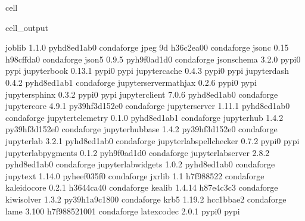 \documentclass[letterpaper,table,10pt,english]{jupyterBook}
\begin{document}
\begin{sphinxuseclass}{cell}
\begin{sphinxVerbatimOutput}
\begin{sphinxuseclass}{cell_output}
\begin{sphinxVerbatim}[commandchars=\\\{\}]
joblib                    1.1.0              pyhd8ed1ab\PYGZus{}0    conda\PYGZhy{}forge
jpeg                      9d                   h36c2ea0\PYGZus{}0    conda\PYGZhy{}forge
json\PYGZhy{}c                    0.15                 h98cffda\PYGZus{}0    conda\PYGZhy{}forge
json5                     0.9.5              pyh9f0ad1d\PYGZus{}0    conda\PYGZhy{}forge
jsonschema                3.2.0                    pypi\PYGZus{}0    pypi
jupyter\PYGZhy{}book              0.13.1                   pypi\PYGZus{}0    pypi
jupyter\PYGZhy{}cache             0.4.3                    pypi\PYGZus{}0    pypi
jupyter\PYGZhy{}dash              0.4.2              pyhd8ed1ab\PYGZus{}1    conda\PYGZhy{}forge
jupyter\PYGZhy{}server\PYGZhy{}mathjax    0.2.6                    pypi\PYGZus{}0    pypi
jupyter\PYGZhy{}sphinx            0.3.2                    pypi\PYGZus{}0    pypi
jupyter\PYGZus{}client            7.0.6              pyhd8ed1ab\PYGZus{}0    conda\PYGZhy{}forge
jupyter\PYGZus{}core              4.9.1            py39hf3d152e\PYGZus{}0    conda\PYGZhy{}forge
jupyter\PYGZus{}server            1.11.1             pyhd8ed1ab\PYGZus{}0    conda\PYGZhy{}forge
jupyter\PYGZus{}telemetry         0.1.0              pyhd8ed1ab\PYGZus{}1    conda\PYGZhy{}forge
jupyterhub                1.4.2            py39hf3d152e\PYGZus{}0    conda\PYGZhy{}forge
jupyterhub\PYGZhy{}base           1.4.2            py39hf3d152e\PYGZus{}0    conda\PYGZhy{}forge
jupyterlab                3.2.1              pyhd8ed1ab\PYGZus{}0    conda\PYGZhy{}forge
jupyterlab\PYGZhy{}spellchecker   0.7.2                    pypi\PYGZus{}0    pypi
jupyterlab\PYGZus{}pygments       0.1.2              pyh9f0ad1d\PYGZus{}0    conda\PYGZhy{}forge
jupyterlab\PYGZus{}server         2.8.2              pyhd8ed1ab\PYGZus{}0    conda\PYGZhy{}forge
jupyterlab\PYGZus{}widgets        1.0.2              pyhd8ed1ab\PYGZus{}0    conda\PYGZhy{}forge
jupytext                  1.14.0             pyheef035f\PYGZus{}0    conda\PYGZhy{}forge
jxrlib                    1.1                  h7f98852\PYGZus{}2    conda\PYGZhy{}forge
kaleido\PYGZhy{}core              0.2.1                h3644ca4\PYGZus{}0    conda\PYGZhy{}forge
kealib                    1.4.14               h87e4c3c\PYGZus{}3    conda\PYGZhy{}forge
kiwisolver                1.3.2            py39h1a9c180\PYGZus{}0    conda\PYGZhy{}forge
krb5                      1.19.2               hcc1bbae\PYGZus{}2    conda\PYGZhy{}forge
lame                      3.100             h7f98852\PYGZus{}1001    conda\PYGZhy{}forge
latexcodec                2.0.1                    pypi\PYGZus{}0    pypi

\end{sphinxVerbatim}
\end{sphinxuseclass}
\end{sphinxVerbatimOutput}
\end{sphinxuseclass}
\end{document}

